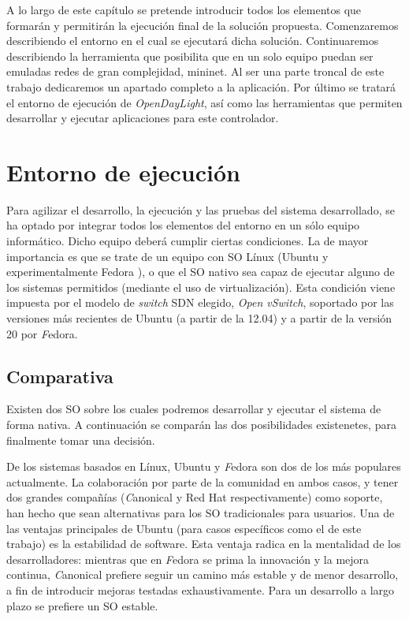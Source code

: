 \documentclass[a4paper,11pt]{book}
\begin{document}
A lo largo de este capítulo se pretende introducir todos los elementos que formarán y permitirán la ejecución final de la solución propuesta. Comenzaremos describiendo el entorno en el cual se ejecutará dicha solución. Continuaremos describiendo la herramienta que posibilita que en un solo equipo puedan ser emuladas redes de gran complejidad, mininet. Al ser una parte troncal de este trabajo dedicaremos un apartado completo a la aplicación. Por último se tratará el entorno de ejecución de \emph{OpenDayLight}, así como las herramientas que permiten desarrollar y ejecutar aplicaciones para este controlador.

\section{Entorno de ejecución}
Para agilizar el desarrollo, la ejecución y las pruebas del sistema desarrollado, se ha optado por integrar todos los elementos del entorno en un sólo equipo informático. Dicho equipo deberá cumplir ciertas condiciones. La de mayor importancia es que se trate de un equipo con \ac{SO} Línux (Ubuntu \cite{ubuntu} y experimentalmente Fedora \cite{fedora}), o que el \ac{SO} nativo sea capaz de ejecutar alguno de los sistemas permitidos (mediante el uso de virtualización). Esta condición viene impuesta por el modelo de \textit{switch} \ac{SDN} elegido, \textit{Open vSwitch}, soportado por las versiones más recientes de Ubuntu (a partir de la 12.04) y a partir de la versión 20 por \textit{F}edora.

\subsection{Comparativa}
Existen dos \ac{SO} sobre los cuales podremos desarrollar y ejecutar el sistema de forma nativa. A continuación se comparán las dos posibilidades existenetes, para finalmente tomar una decisión.

De los sistemas basados en Línux, Ubuntu y \textit{F}edora son dos de los más populares actualmente. La colaboración por parte de la comunidad en ambos casos, y tener dos grandes compañías (\textit{C}anonical y Red Hat respectivamente) como soporte, han hecho que sean alternativas para los \ac{SO} tradicionales para usuarios. Una de las ventajas principales de Ubuntu (para casos específicos como el de este trabajo) es la estabilidad de software. Esta ventaja radica en la mentalidad de los desarrolladores: mientras que en \textit{F}edora se prima la innovación y la mejora continua, \textit{C}anonical prefiere seguir un camino más estable y de menor desarrollo, a fin de introducir mejoras testadas exhaustivamente. Para un desarrollo a largo plazo se prefiere un \ac{SO} estable. 
\end{document}

